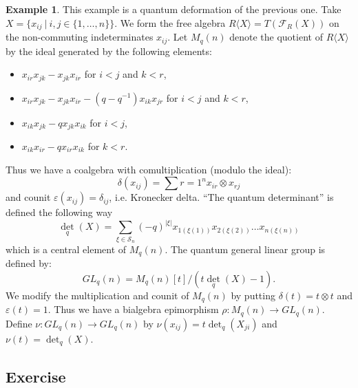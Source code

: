 \documentclass[8pt]{article}
\theoremstyle{definition}
\theoremstyle{definition}
\theoremstyle{definition}
\theoremstyle{definition}
\theoremstyle{definition}
\theoremstyle{definition}
\theoremstyle{definition}
\theoremstyle{definition}
\theoremstyle{definition}
\theoremstyle{definition}
\theoremstyle{definition}
\theoremstyle{definition}
\newtheorem{example}{Example}[section]
\theoremstyle{definition}
\theoremstyle{definition}
\theoremstyle{question}
\begin{document}
\begin{example}
  This example is a quantum deformation of the previous one. Take $X = \{ x_{ij} \: | \: i,j \in \{ 1, \ldots, n \}\}$.
  We form the free algebra $R\langle X \rangle = T (\mathcal{F}_R(X))$ on the non-commuting indeterminates $x_{ij}$.
  Let $M_q(n)$ denote the quotient of $R\langle X \rangle$ by the ideal generated by the following elements:
  \begin{itemize}
    \item $x_{ir} x_{jk} - x_{jk} x_{ir}$ for $i < j$ and $k < r$,
    \item $x_{ir} x_{jk} - x_{jk} x_{ir} - (q - q^{-1})x_{ik} x_{jr}$ for $i < j$ and $k < r$,
    \item $x_{ik} x_{jk} - q x_{jk} x_{ik}$ for $i < j$,
    \item $x_{ik} x_{ir} - q x_{ir} x_{ik}$ for $k < r$.
  \end{itemize}

  Thus we have a coalgebra with comultiplication (modulo the ideal):
  \[
  \delta(x_{ij}) = \sum \limits{r = 1}^n x_{ir} \otimes x_{rj}
  \]
  and counit $\varepsilon(x_{ij}) = \delta_{ij}$, i.e. Kronecker delta. ``The quantum determinant'' is defined the following way
  \[
  \operatorname{det}_q(X) = \sum \limits_{\xi \in \mathcal{S}_n} (-q)^{|\xi|} x_{1 (\xi(1))} x_{2 (\xi(2))} \ldots x_{n (\xi(n))}
  \]
  which is a central element of $M_q(n)$. The quantum general linear group is defined by:
  \[
  GL_q (n) = M_q(n)[t]/(t \operatorname{det}_q(X) - 1).
  \]
  We modify the multiplication and counit of $M_q(n)$ by putting $\delta(t) = t \otimes t$ and $\varepsilon(t) = 1$. Thus we have a bialgebra
  epimorphism $\rho : M_q(n) \to GL_q(n)$. Define $\nu : GL_q(n) \to GL_q(n)$ by
  $\nu(x_{ij}) = t \operatorname{det}_q (X_{ji})$ and $\nu(t) = \operatorname{det}_q (X)$.
\end{example}

\subsection{Exercise}
\end{document}

